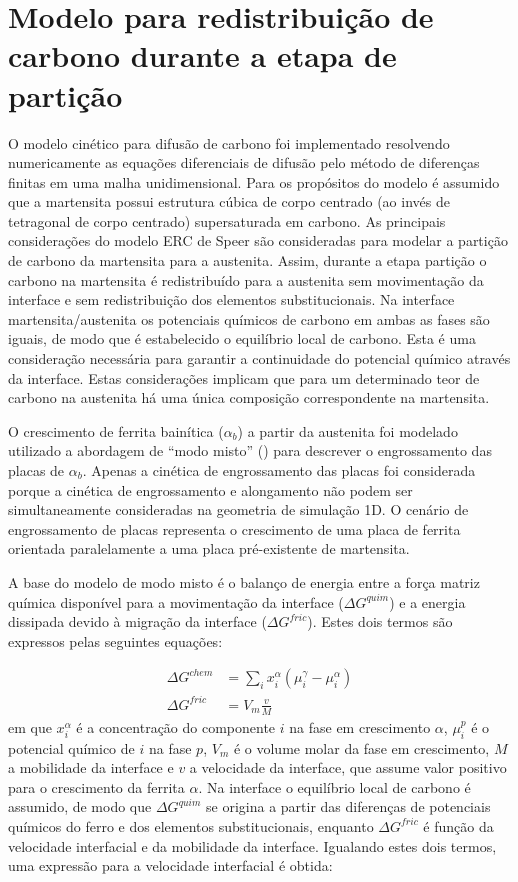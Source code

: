 \section{Modelo para redistribuição de carbono durante a etapa de partição}

O modelo cinético para difusão de carbono foi implementado resolvendo numericamente as equações diferenciais de difusão pelo método de diferenças finitas em uma malha unidimensional. Para os propósitos do modelo é assumido que a martensita possui estrutura cúbica de corpo centrado (ao invés de tetragonal de corpo centrado) supersaturada em carbono. As principais considerações do modelo ERC de Speer são consideradas para modelar a partição de carbono da martensita para a austenita. Assim, durante a etapa partição o carbono na martensita é redistribuído para a austenita sem movimentação da interface e sem redistribuição dos elementos substitucionais. Na interface martensita/austenita os potenciais químicos de carbono em ambas as fases são iguais, de modo que é estabelecido o equilíbrio local de carbono. Esta é uma consideração necessária para garantir a continuidade do potencial químico através da interface. Estas considerações implicam que para um determinado teor de carbono na austenita há uma única composição correspondente na martensita.

O crescimento de ferrita bainítica ($\alpha_b$) a partir da austenita foi modelado utilizado a abordagem de ``modo misto'' () para descrever o engrossamento das placas de $\alpha_b$. Apenas a cinética de engrossamento das placas foi considerada porque a cinética de engrossamento e alongamento não podem ser simultaneamente consideradas na geometria de simulação 1D. O cenário de engrossamento de placas representa o crescimento de uma placa de ferrita orientada paralelamente a uma placa pré-existente de martensita.

A base do modelo de modo misto é o balanço de energia entre a força matriz química disponível para a movimentação da interface ($\Delta G^{quim}$) e a energia dissipada devido à migração da interface ($\Delta G^{fric}$). Estes dois termos são expressos pelas seguintes equações:

\begin{align}
  \Delta G^{chem} &= \sum_i x_i^\alpha \left( \mu_i^{\gamma} - \mu_i^{\alpha} \right) \label{eq:F_quim}\\
  \Delta G^{fric} &= V_m \frac{v}{M} \label{eq:F_fric}
\end{align}
%
em que $x_i^\alpha$ é a concentração do componente $i$ na fase em crescimento $\alpha$, $\mu_i^p$ é o potencial químico de $i$ na fase $p$, $V_m$ é o volume molar da fase em crescimento, $M$ a mobilidade da interface e $v$ a velocidade da interface, que assume valor positivo para o crescimento da ferrita $\alpha$. Na interface o equilíbrio local de carbono é assumido, de modo que $\Delta G^{quim}$ se origina a partir das diferenças de potenciais químicos do ferro e dos elementos substitucionais, enquanto $\Delta G^{fric}$ é função da velocidade interfacial e da mobilidade da interface. Igualando estes dois termos, uma expressão para a velocidade interfacial é obtida:


